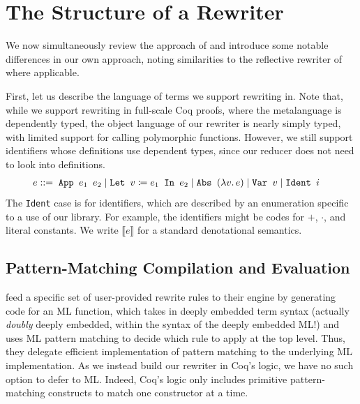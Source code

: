 \section{The Structure of a Rewriter}\label{sec:structure}

We now simultaneously review the approach of \textcite{Aehlig} and introduce some notable differences in our own approach, noting similarities to the reflective rewriter of \textcite{rtac} where applicable.

First, let us describe the language of terms we support rewriting in.
Note that, while we support rewriting in full-scale Coq proofs, where the metalanguage is dependently typed, the object language of our rewriter is nearly simply typed, with limited support for calling polymorphic functions.
However, we still support identifiers whose definitions use dependent types, since our reducer does not need to look into definitions.
\begin{align*}
  e ::={}& \phantom{\mid} \texttt{App }e_1\texttt{ }e_2 \mid \texttt{Let }v \defeq e_1\texttt{ In }e_2 %
  \mid \texttt{Abs }(\lambda v.\,e) \mid \texttt{Var }v \mid \texttt{Ident }i
\end{align*}
The \texttt{Ident} case is for identifiers, which are described by an enumeration specific to a use of our library.
For example, the identifiers might be codes for $+$, $\cdot$, and literal constants.
We write $\llbracket e \rrbracket$ for a standard denotational semantics.

\subsection{Pattern-Matching Compilation and Evaluation}\label{sec:pattern-matching-compilation-and-evaluation}

\textcite{Aehlig} feed a specific set of user-provided rewrite rules to their engine by generating code for an ML function, which takes in deeply embedded term syntax (actually \emph{doubly} deeply embedded, within the syntax of the deeply embedded ML!) and uses ML pattern matching to decide which rule to apply at the top level.
Thus, they delegate efficient implementation of pattern matching to the underlying ML implementation.
As we instead build our rewriter in Coq's logic, we have no such option to defer to ML.
Indeed, Coq's logic only includes primitive pattern-matching constructs to match one constructor at a time.

